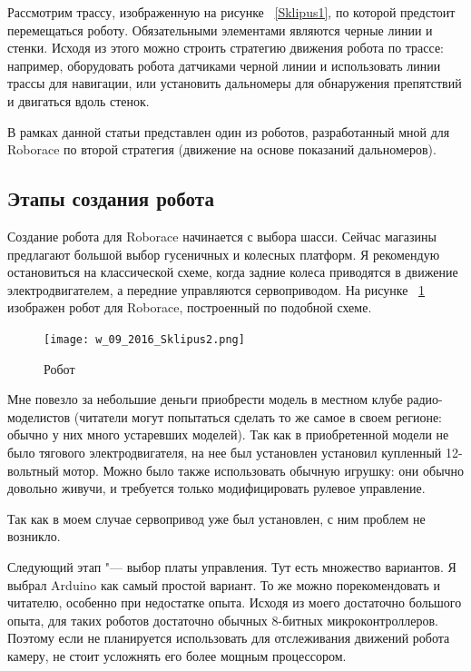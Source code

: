 \documentclass[10pt, a5paper]{article}
\begin{document}
Рассмотрим трассу, изображенную на рисунке ~\ref{Sklipus1}, по которой предстоит перемещаться роботу. Обязательными элементами являются черные линии и стенки. Исходя из этого можно строить стратегию движения робота по трассе: например, оборудовать робота датчиками черной линии и использовать линии трассы для навигации, или установить дальномеры для обнаружения препятствий и двигаться вдоль стенок.

В рамках данной статьи представлен один из роботов, разработанный мной для Roborace по второй стратегия (движение на основе показаний дальномеров).

\subsection*{Этапы создания робота}

Создание робота для Roborace начинается с выбора шасси. Сейчас магазины предлагают большой выбор гусеничных и колесных платформ. Я рекомендую остановиться на классической схеме, когда задние колеса приводятся в движение электродвигателем, а передние управляются сервоприводом\footnotemark[1]. На рисунке ~\ref{Sklipus2} изображен робот для Roborace, построенный по подобной схеме.

\begin{figure}[h!]
  \centering
  \texttt{[image: w\_09\_2016\_Sklipus2.png]}
  \caption {Робот}\label{Sklipus2}
\end{figure}

Мне повезло за небольшие деньги приобрести модель в местном клубе радио-моделистов (читатели могут попытаться сделать то же самое в своем регионе: обычно у них много устаревших моделей). Так как в приобретенной модели не было тягового электродвигателя, на нее был установлен установил купленный 12-вольтный мотор. Можно было также использовать обычную игрушку: они обычно довольно живучи, и требуется только модифицировать рулевое управление.

Так как в моем случае сервопривод уже был установлен, с ним проблем не возникло.

Следующий этап "--- выбор платы управления. Тут есть множество вариантов. Я выбрал Arduino как самый простой вариант. То же можно порекомендовать и читателю, особенно при недостатке опыта. Исходя из моего достаточно большого опыта, для таких роботов достаточно обычных 8-битных микроконтроллеров. Поэтому если не планируется использовать для отслеживания движений робота камеру, не стоит усложнять его более мощным процессором.
\end{document}
